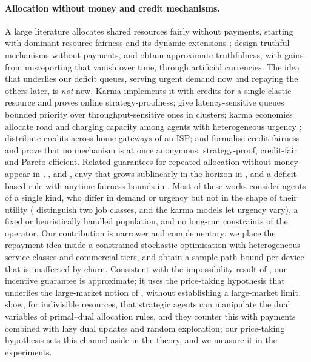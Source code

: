 \documentclass[preprint,11pt]{elsarticle}
\theoremstyle{definition}
\theoremstyle{remark}
\begin{document}
\paragraph{Allocation without money and credit mechanisms.}
A large literature allocates shared resources fairly without payments, starting with dominant resource fairness \citep{ghodsi2011dominant} and its dynamic extensions \citep{kash2014no,freeman2018dynamic,fikioris2021incentives}; \citet{cole2013mechanism} design truthful mechanisms without payments, and \citet{gorokh2021monetary} obtain approximate truthfulness, with gains from misreporting that vanish over time, through artificial currencies.
The idea that underlies our deficit queues, serving urgent demand now and repaying the others later, is \emph{not} new.
Karma \citep{vuppalapati2023karma} implements it with credits for a single elastic resource and proves online strategy-proofness; \citet{le2019bopf} give latency-sensitive queues bounded priority over throughput-sensitive ones in clusters; karma economies allocate road and charging capacity among agents with heterogeneous urgency \citep{elokda2024karma,elokda2025carma,elokda2026ev}; \citet{wong2013myob} distribute credits across home gateways of an ISP; and \citet{zahedi2026credit} formalise credit fairness and prove that no mechanism is at once anonymous, strategy-proof, credit-fair and Pareto efficient.
Related guarantees for repeated allocation without money appear in \citet{balseiro2019nomoney}, \citet{banerjee2023pseudo}, \citet{fikioris2025dmmf} and \citet{lin2026spec}, envy that grows sublinearly in the horizon in \citet{benade2018envy}, and a deficit-based rule with anytime fairness bounds in \citet{kahana2026perpetual}.
Most of these works consider agents of a single kind, who differ in demand or urgency but not in the shape of their utility (\citet{le2019bopf} distinguish two job classes, and the karma models let urgency vary), a fixed or heuristically handled population, and no long-run constraints of the operator.
Our contribution is narrower and complementary: we place the repayment idea inside a constrained stochastic optimisation with heterogeneous service classes and commercial tiers, and obtain a sample-path bound per device that is unaffected by churn.
Consistent with the impossibility result of \citet{zahedi2026credit}, our incentive guarantee is approximate; it uses the price-taking hypothesis that underlies the large-market notion of \citet{azevedo2019strategy}, without establishing a large-market limit.
\citet{dai2025efficiency} show, for indivisible resources, that strategic agents can manipulate the dual variables of primal--dual allocation rules, and they counter this with payments combined with lazy dual updates and random exploration; our price-taking hypothesis sets this channel aside in the theory, and we measure it in the experiments.
\end{document}
